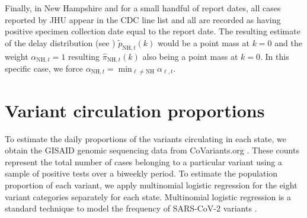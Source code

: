 
Finally, in New Hampshire and for a small handful of report dates, all cases
reported by JHU appear in the CDC line list and all are recorded as having
positive specimen collection date equal to the report date. The resulting
estimate of the delay distribution (see )
$\widetilde{p}_{\textrm{NH},t}(k)$ would be a point mass at $k=0$ and the weight
$\alpha_{\textrm{NH},t}=1$ resulting $\widehat\pi_{\textrm{NH},t}(k)$ also being a
point mass at $k=0$. In this specific case, we force $\alpha_{\textrm{NH},t} =
\min_{\ell\neq\textrm{NH}} \alpha_{\ell,t}$.

\section{Variant circulation proportions}
\label{sec:variant-proportions}


To estimate the daily proportions of the variants circulating in each state, we
obtain the GISAID genomic sequencing data from CoVariants.org
\citep{hodcroft2021covariants, elbe2017data}. These counts represent the total
number of cases belonging to a particular variant using
a sample of positive tests over a biweekly period. To estimate the population
proportion of each variant, we apply multinomial logistic regression 
for the eight variant categories separately for each state. 
Multinomial logistic regression is a standard technique to model the
frequency of SARS-CoV-2 variants 
\citep{obermeyer2022analysis, annavajhala2021emergence, figgins2021sars}.

